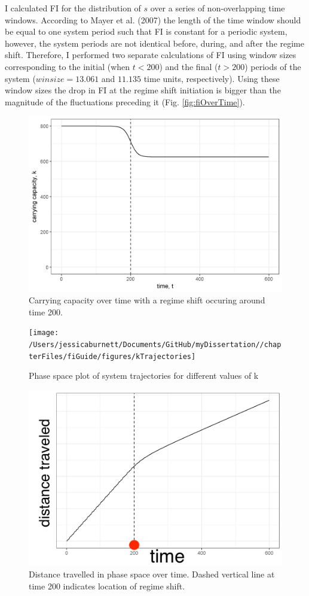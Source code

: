\documentclass[12pt,twoside,openany]{reedthesis}
\begin{document}
I calculated FI for the distribution of \(s\) over a series of non-overlapping time windows. According to Mayer et al. (2007) the length of the time window should be equal to one system period such that FI is constant for a periodic system, however, the system periods are not identical before, during, and after the regime shift. Therefore, I performed two separate calculations of FI using window sizes corresponding to the initial (when \(t<200\)) and the final (\(t>200\)) periods of the system (\(winsize = 13.061\) and \(11.135\) time units, respectively). Using these window sizes the drop in FI at the regime shift initiation is bigger than the magnitude of the fluctuations preceding it (Fig. \ref{fig:fiOverTime}).
\begin{figure}
\includegraphics[width=0.85\linewidth]{./chapterFiles/fiGuide/figures/kByTime} \caption{Carrying capacity over time with a regime shift occuring around time 200.}\label{fig:kByTime}
\end{figure}
\begin{figure}
\texttt{[image: /Users/jessicaburnett/Documents/GitHub/myDissertation//chapterFiles/fiGuide/figures/kTrajectories]} \caption{Phase space plot of system trajectories for different values of k}\label{fig:kTrajectories}
\end{figure}
\begin{figure}
\includegraphics[width=0.85\linewidth]{./chapterFiles/fiGuide/figures/sOverTime} \caption{Distance travelled in phase space over time. Dashed vertical line at time 200 indicates location of regime shift.}\label{fig:sOverTime}
\end{figure}
\end{document}
